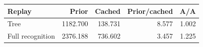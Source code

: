 \begin{tabular}{lrrrr}
\toprule
Replay & Prior & Cached & Prior/cached & A/A \\
\midrule
Tree & 1182.700 & 138.731 & 8.577 & 1.002 \\
Full recognition & 2376.188 & 736.602 & 3.457 & 1.225 \\
\bottomrule
\end{tabular}
